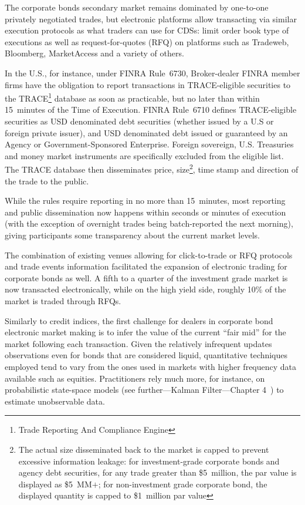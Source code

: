 The corporate bonds secondary market remains dominated by one-to-one privately negotiated trades, but electronic platforms allow transacting via similar execution protocols as what traders can use for CDSs: limit order book type of executions as well as request-for-quotes (RFQ) on platforms such as Tradeweb, Bloomberg, MarketAccess and a variety of others.


In the U.S., for instance, under FINRA Rule~6730, Broker-dealer FINRA member firms have the obligation to report transactions in TRACE-eligible securities to the TRACE\footnote{Trade Reporting And Compliance Engine} database as soon as practicable, but no later than within 15~minutes of the Time of Execution. FINRA Rule~6710 defines TRACE-eligible securities as USD denominated debt securities (whether issued by a U.S or foreign private issuer), and USD denominated debt issued or guaranteed by an Agency or Government-Sponsored Enterprise. Foreign sovereign, U.S. Treasuries and money market instruments are specifically excluded from the eligible list. The TRACE database then disseminates price, size\footnote{The actual size disseminated back to the market is capped to prevent excessive information leakage: for investment-grade corporate bonds and agency debt securities, for any trade greater than \$5~million, the par value is displayed as \$5~MM$+$; for non-investment grade corporate bond, the displayed quantity is capped to \$1~million par value}, time stamp and direction of the trade to the public.


While the rules require reporting in no more than 15~minutes, most reporting and public dissemination now happens within seconds or minutes of execution (with the exception of overnight trades being batch-reported the next morning), giving participants some transparency about the current market levels.


The combination of existing venues allowing for click-to-trade or RFQ protocols and trade events information facilitated the expansion of electronic trading for corporate bonds as well. A fifth to a quarter of the investment grade market is now transacted electronically, while on the high yield side, roughly 10\% of the market is traded through RFQs.


Similarly to credit indices, the first challenge for dealers in corporate bond electronic market making is to infer the value of the current ``fair mid'' for the market following each transaction. Given the relatively infrequent updates observations even for bonds that are considered liquid, quantitative techniques employed tend to vary from the ones used in markets with higher frequency data available such as equities. Practitioners rely much more, for instance, on probabilistic state-space models (see further---Kalman Filter---Chapter 4~\cite{harvey1989kalman}) to estimate unobservable data.


